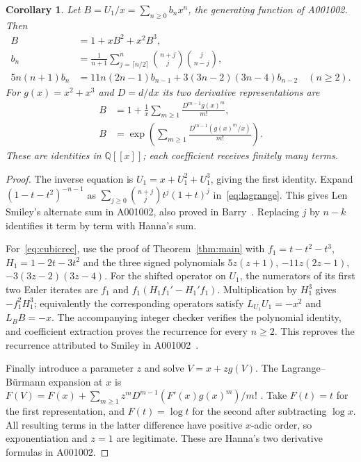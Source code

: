 \documentclass[10pt]{article}
\newtheorem{corollary}[theorem]{Corollary}
\newcommand{\Q}{\mathbb{Q}}
\begin{document}
\begin{corollary}\label{cor:cubic}
Let $B=U_1/x=\sum_{n\geq0}b_nx^n$, the generating function of A001002.
Then
\begin{align}
 B&=1+xB^2+x^2B^3,\\
 b_n&=\frac1{n+1}\sum_{j=\lceil n/2\rceil}^n
       \binom{n+j}{j}\binom{j}{n-j},\\
 5n(n+1)b_n&=11n(2n-1)b_{n-1}
       +3(3n-2)(3n-4)b_{n-2}\quad(n\geq2).\label{eq:cubicrec}
\end{align}
For $g(x)=x^2+x^3$ and $D=d/dx$ its two derivative representations are
\begin{align}
 B&=1+\frac1x\sum_{m\geq1}\frac{D^{m-1}g(x)^m}{m!},\\
 B&=\exp\left(\sum_{m\geq1}\frac{D^{m-1}(g(x)^m/x)}{m!}\right).
\end{align}
These are identities in $\Q[[x]]$; each coefficient receives finitely many terms.
\end{corollary}
\begin{proof}
The inverse equation is $U_1=x+U_1^2+U_1^3$, giving the first identity.
Expand $(1-t-t^2)^{-n-1}$ as
$\sum_{j\geq0}\binom{n+j}{j}t^j(1+t)^j$ in~\eqref{eq:lagrange}.
This gives Len Smiley's alternate sum in A001002, also proved in
Barry~\cite[Example 7]{barry}. Replacing $j$ by $n-k$ identifies it
term by term with Hanna's sum.

For~\eqref{eq:cubicrec}, use the proof of Theorem~\ref{thm:main} with
$f_1=t-t^2-t^3$, $H_1=1-2t-3t^2$ and the three signed polynomials
$5z(z+1)$, $-11z(2z-1)$, $-3(3z-2)(3z-4)$.
For the shifted operator on $U_1$, the numerators of its first two Euler
iterates are $f_1$ and $f_1(H_1f_1'-H_1'f_1)$.
Multiplication by $H_1^3$ gives $-f_1^2H_1^3$; equivalently the
corresponding operators satisfy $L_{U_1}U_1=-x^2$ and $L_BB=-x$.
The accompanying integer checker verifies the polynomial identity, and
coefficient extraction proves the recurrence for every $n\geq2$.
This reproves the recurrence
attributed to Smiley in A001002~\cite{oeis1}.

Finally introduce a parameter $z$ and solve $V=x+zg(V)$.
The Lagrange--B\"urmann expansion at $x$ is
$F(V)=F(x)+\sum_{m\geq1}z^mD^{m-1}(F'(x)g(x)^m)/m!$
\cite[Section 2.1]{gessel}. Take $F(t)=t$ for the first representation,
and $F(t)=\log t$ for the second after subtracting $\log x$.
All resulting terms in the latter difference have positive $x$-adic
order, so exponentiation and $z=1$ are legitimate. These are Hanna's
two derivative formulas in A001002.
\end{proof}
\end{document}
